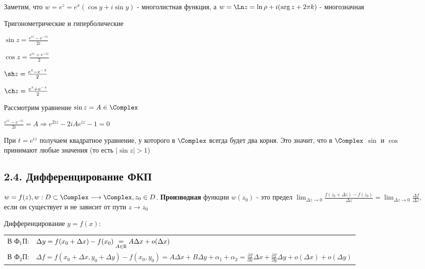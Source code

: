 \documentclass[12pt]{article}
\begin{document}






Заметим, что $w = e^z = e^x (\cos y + i \sin y)$ - многолистная функция, а $w = \Ln z = \ln \rho + i (\arg z + 2\pi k)$ - многозначная

 Тригонометрические и гиперболические

\begin{multicols}{2}
    \begin{center}
        $\sin z = \frac{e^{iz} - e^{-iz}}{2i}$

        $\cos z = \frac{e^{iz} + e^{-iz}}{2}$

        $\sh z = \frac{e^{z} - e^{-z}}{2}$

        $\ch z = \frac{e^{z} + e^{-z}}{2}$
    \end{center}
\end{multicols}

\Nota Рассмотрим уравнение $\sin z = A \in \Complex$

$\frac{e^{iz} - e^{-iz}}{2i} = A \Longrightarrow e^{2iz} - 2iAe^{iz} - 1 = 0$

При $t = e^{iz}$ получаем квадратное уравнение, у которого в $\Complex$ всегда будет два корня. 
Это значит, что в $\Complex$ $\sin$ и $\cos$ принимают любые значения (то есть $|\sin z| > 1$)

\subsection{2.4. Дифференцирование ФКП}

\Def $w = f(z), w : D \subset \Complex \longrightarrow \Complex, z_0 \in D$. \textbf{Производная} функции
$w(z_0)$ - это предел $\lim_{\Delta z \to 0} \frac{f(z_0 + \Delta z) - f(z_0)}{\Delta z} = \lim_{\Delta z \to 0} \frac{\Delta f}{\Delta z}$, 
если он существует и не зависит от пути $z \to z_0$

\Mem Дифференцирование $y = f(x)$:

\begin{tabular}{ll}
    В Ф$_1$П: & $\Delta y = f(x_0 + \Delta x) - f(x_0) \underset{A \in \mathbb{R}}{=} A\Delta x + o(\Delta x)$ \\
    В Ф$_2$П: & $\Delta f = f(x_0 + \Delta x, y_0 + \Delta y) - f(x_0, y_0) = A\Delta x + B \Delta y + \alpha_1 + \alpha_2 = 
    \frac{\partial f}{\partial x} \Delta x + \frac{\partial f}{\partial y} \Delta y + o(\Delta x) + o(\Delta y)$
\end{tabular}
\end{document}

